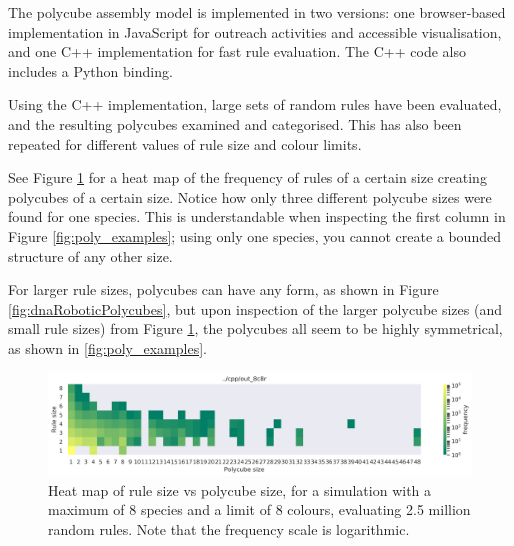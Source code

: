 The polycube assembly model is implemented in two versions: one browser-based implementation in JavaScript for outreach activities and accessible visualisation, and one C++ implementation for fast rule evaluation. The C++ code also includes a Python binding.

Using the C++ implementation, large sets of random rules have been evaluated, and the resulting polycubes examined and categorised. This has also been repeated for different values of rule size and colour limits.

See Figure \ref{fig:rs_vs_ps} for a heat map of the frequency of rules of a certain size creating polycubes of a certain size. Notice how only three different polycube sizes were found for one species. This is understandable when inspecting the first column in Figure \ref{fig:poly_examples}; using only one species, you cannot create a bounded structure of any other size.

For larger rule sizes, polycubes can have any form, as shown in Figure \ref{fig:dnaRoboticPolycubes}, but upon inspection of the larger polycube sizes (and small rule sizes) from Figure \ref{fig:rs_vs_ps}, the polycubes all seem to be highly symmetrical, as shown in \ref{fig:poly_examples}.


\begin{figure}
\centering\includegraphics[width=\textwidth]{figures/rs_vs_ps_8c8r.png}
\caption{Heat map of rule size vs polycube size, for a simulation with a maximum of 8 species and a limit of 8 colours, evaluating 2.5 million random rules. Note that the frequency scale is logarithmic.}
\label{fig:rs_vs_ps}\end{figure}


